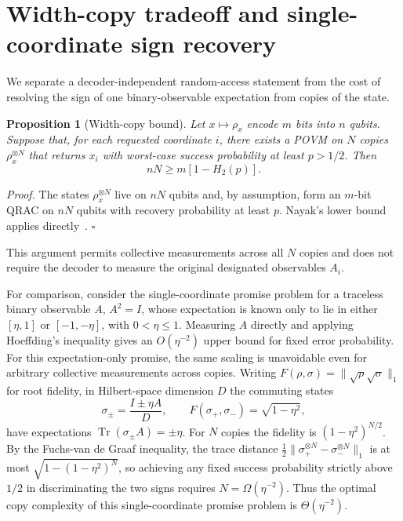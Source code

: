 \documentclass[10pt,aps,pra,twocolumn,superscriptaddress,nofootinbib,longbibliography]{revtex4-2}
\newtheorem{proposition}{Proposition}
\newcommand{\Tr}{\operatorname{Tr}}
\begin{document}
{\section{Width-copy tradeoff and single-coordinate sign recovery}
\label{supp:readout}
We separate a decoder-independent random-access statement from the cost of resolving the sign of one binary-observable expectation from copies of the state.

\begin{proposition}[Width-copy bound]
Let $x\mapsto\rho_x$ encode $m$ bits into $n$ qubits.  Suppose that, for each requested coordinate $i$, there exists a POVM on $N$ copies $\rho_x^{\otimes N}$ that returns $x_i$ with worst-case success probability at least $p>1/2$.  Then
\begin{equation}
    nN\ge m[1-H_2(p)].
    \label{eq:s-width-copies}
\end{equation}
\end{proposition}

\noindent\emph{Proof.}
The states $\rho_x^{\otimes N}$ live on $nN$ qubits and, by assumption, form an $m$-bit QRAC on $nN$ qubits with recovery probability at least $p$.  Nayak's lower bound applies directly~\cite{Nayak1999QRAC}.  \hfill$\square$

This argument permits collective measurements across all $N$ copies and does not require the decoder to measure the original designated observables $A_i$.

For comparison, consider the single-coordinate promise problem for a traceless binary observable $A$, $A^2=I$, whose expectation is known only to lie in either $[\eta,1]$ or $[-1,-\eta]$, with $0<\eta\le1$.  Measuring $A$ directly and applying Hoeffding's inequality gives an $O(\eta^{-2})$ upper bound for fixed error probability.  For this expectation-only promise, the same scaling is unavoidable even for arbitrary collective measurements across copies.  Writing $F(\rho,\sigma)=\|\sqrt{\rho}\sqrt{\sigma}\|_1$ for root fidelity, in Hilbert-space dimension $D$ the commuting states
\begin{equation}
    \sigma_\pm=\frac{I\pm\eta A}{D},
    \qquad
    F(\sigma_+,\sigma_-)=\sqrt{1-\eta^2},
\end{equation}
have expectations $\Tr(\sigma_\pm A)=\pm\eta$.  For $N$ copies the fidelity is $(1-\eta^2)^{N/2}$.  By the Fuchs-van de Graaf inequality, the trace distance $\tfrac12\|\sigma_+^{\otimes N}-\sigma_-^{\otimes N}\|_1$ is at most $\sqrt{1-(1-\eta^2)^N}$, so achieving any fixed success probability strictly above $1/2$ in discriminating the two signs requires $N=\Omega(\eta^{-2})$.  Thus the optimal copy complexity of this single-coordinate promise problem is $\Theta(\eta^{-2})$.

}
\end{document}
